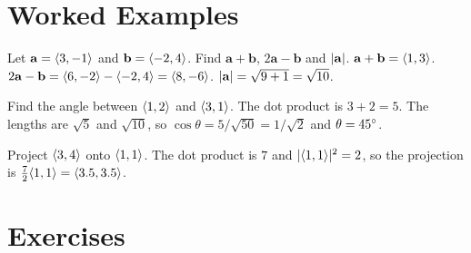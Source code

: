 \section{Worked Examples}

\begin{example}
Let $\mathbf{a} = \langle 3, -1 \rangle$ and $\mathbf{b} = \langle -2, 4 \rangle$. Find $\mathbf{a} + \mathbf{b}$, $2\mathbf{a} - \mathbf{b}$ and $\lvert \mathbf{a} \rvert$.
\solution $\mathbf{a} + \mathbf{b} = \langle 1, 3 \rangle$. $2\mathbf{a} - \mathbf{b} = \langle 6, -2 \rangle - \langle -2, 4 \rangle = \langle 8, -6 \rangle$. $\lvert \mathbf{a} \rvert = \sqrt{9 + 1} = \sqrt{10}$.
\end{example}

\begin{example}
Find the angle between $\langle 1, 2 \rangle$ and $\langle 3, 1 \rangle$.
\solution The dot product is $3 + 2 = 5$. The lengths are $\sqrt{5}$ and $\sqrt{10}$, so $\cos\theta = 5/\sqrt{50} = 1/\sqrt{2}$ and $\theta = 45^\circ$.
\end{example}

\begin{example}
Project $\langle 3, 4 \rangle$ onto $\langle 1, 1 \rangle$.
\solution The dot product is $7$ and $\lvert \langle 1, 1 \rangle \rvert^2 = 2$, so the projection is $\tfrac{7}{2}\langle 1, 1 \rangle = \langle 3.5, 3.5 \rangle$.
\end{example}

\section{Exercises}

